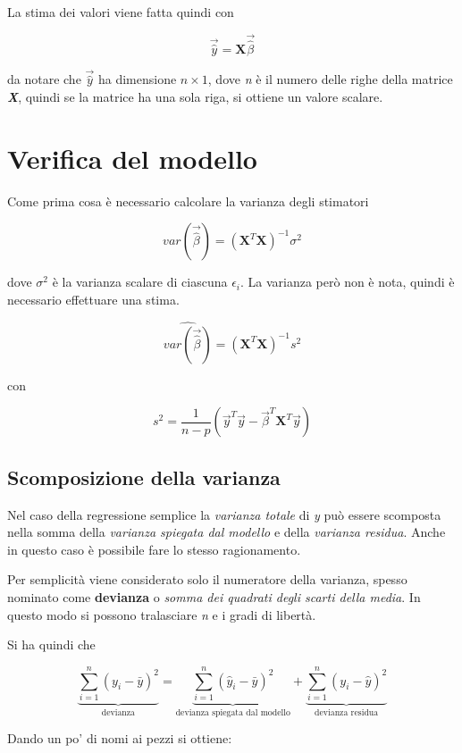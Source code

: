 La stima dei valori viene fatta quindi con 

$$
\vec{\hat{y}} = \textbf{X}\vec{\hat{\beta}}
$$

da notare che $ \vec{\hat{y}} $ ha dimensione $ n \times 1 $, dove \textit{n} è il numero delle righe della matrice \textbf{\textit{X}}, quindi se la matrice ha una sola riga, si ottiene un valore scalare.

\section{Verifica del modello}

Come prima cosa è necessario calcolare la varianza degli stimatori

$$
var(\vec{\hat{\beta}}) = (\textbf{X}^T\textbf{X})^{-1}\sigma^2
$$

dove $ \sigma^2 $ è la varianza scalare di ciascuna $ \epsilon_i $.
La varianza però non è nota, quindi è necessario effettuare una stima.

$$
\widehat{var(\vec{\hat{\beta}})} = (\textbf{X}^T\textbf{X})^{-1}s^2
$$

con

$$
s^2 = \frac{1}{n - p}(\vec{y}^T\vec{y} - \vec{\beta}^T \textbf{X}^T \vec{y})
$$

\subsection{Scomposizione della varianza}

Nel caso della regressione semplice la \textit{varianza totale} di \textit{y} può essere scomposta nella somma della \textit{varianza spiegata dal modello} e della \textit{varianza residua}. Anche in questo caso è possibile fare lo stesso ragionamento.

Per semplicità viene considerato solo il numeratore della varianza, spesso nominato come \textbf{devianza} o \textit{somma dei quadrati degli scarti della media}. In questo modo si possono tralasciare \textit{n} e i gradi di libertà.

Si ha quindi che 

$$
\underbrace{\sum\limits_{i=1}^n (y_i - \bar{y})^2}_{\text{devianza}} = \underbrace{\sum\limits_{i=1}^n (\hat{y}_i - \bar{y})^2}_{\text{devianza spiegata dal modello}} + \underbrace{\sum\limits_{i=1}^n (y_i - \hat{y})^2}_{\text{devianza residua}}  
$$

Dando un po' di nomi ai pezzi si ottiene:

